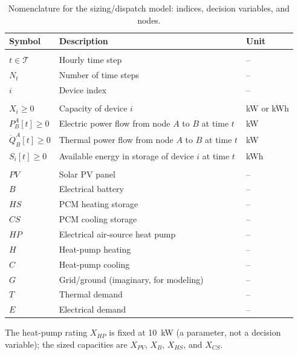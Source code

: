 \documentclass[11pt]{article}
\begin{document}
\begin{table}[!htbp]
\centering
\caption{Nomenclature for the sizing/dispatch model: indices, decision variables, and nodes.}
\label{tab:nomenclature}
\small
\begin{tabular}{lll}
\toprule
Symbol & Description & Unit \\
\midrule
\addlinespace
\multicolumn{3}{@{}l}{\textit{Indices and sets}}\\
\( t \in \mathcal{T} \)   & Hourly time step & -- \\
\( N_t \)                 & Number of time steps & -- \\
\( i \)                   & Device index & -- \\
\addlinespace
\multicolumn{3}{@{}l}{\textit{Decision variables}}\\
\( X_i \geq 0 \)          & Capacity of device \( i \) & kW or kWh \\
\( P^A_B[t] \geq 0 \)     & Electric power flow from node \( A \) to \( B \) at time \( t \) & kW \\
\( \dot{Q}^A_B[t] \geq 0 \) & Thermal power flow from node \( A \) to \( B \) at time \( t \) & kW \\
\( S_i[t] \geq 0 \)       & Available energy in storage of device \( i \) at time \( t \) & kWh \\
\addlinespace
\multicolumn{3}{@{}l}{\textit{Nodes}}\\
\( PV \) & Solar PV panel & -- \\
\( B \)  & Electrical battery & -- \\
\( HS \) & PCM heating storage & -- \\
\( CS \) & PCM cooling storage & -- \\
\( HP \) & Electrical air-source heat pump & -- \\
\( H \)  & Heat-pump heating & -- \\
\( C \)  & Heat-pump cooling & -- \\
\( G \)  & Grid/ground (imaginary, for modeling) & -- \\
\( T \)  & Thermal demand & -- \\
\( E \)  & Electrical demand & -- \\
\bottomrule
\end{tabular}

\smallskip
{\footnotesize The heat-pump rating $X_{HP}$ is fixed at 10~kW (a parameter, not a decision
variable); the sized capacities are $X_{PV}$, $X_{B}$, $X_{HS}$, and $X_{CS}$.}
\end{table}
\end{document}
